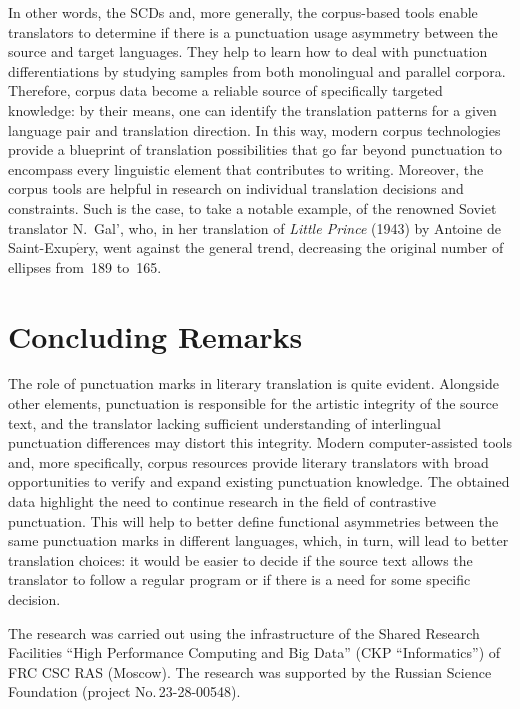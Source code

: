 \begin{multicols}{2}
  In other words, the SCDs and, more generally, the corpus-based tools enable 
translators to determine if there is a punctuation usage asymmetry between the 
source and target languages. They help to learn how to deal with punctuation 
differentiations by studying samples from both monolingual and parallel corpora. 
Therefore, corpus data become a reliable source of specifically targeted 
knowledge: by their means, one can identify the translation patterns for a given 
language pair and translation direction. In this way, modern corpus technologies 
provide a blueprint of translation possibilities that go far beyond punctuation to 
encompass every linguistic element that contributes to writing. Moreover, the 
corpus tools are helpful in research on individual translation decisions and 
constraints. Such is the case, to take a notable example, of the renowned Soviet 
translator N.~Gal', who, in her translation of \textit{Little Prince} (1943) by 
Antoine de Saint-Exup$\acute{\mbox{e}}$ry, went against the general trend, 
decreasing the original number of ellipses from~189 to~165.
  
    \section{Concluding Remarks}
    
    \noindent
     The role of punctuation marks in literary translation is quite evident. 
Alongside other elements, punctuation is responsible for the artistic integrity of the 
source text, and the translator lacking sufficient understanding of interlingual 
punctuation differences may distort this integrity. Modern computer-assisted tools 
and, more specifically, corpus resources provide literary translators with broad 
opportunities to verify and expand existing punctuation knowledge. The obtained 
data highlight the need to continue research in the field of contrastive punctuation. 
This will help to better define functional asymmetries between the same 
punctuation marks in different languages, which, in turn, will lead to better 
translation choices: it would be easier to decide if the source text allows the 
translator to follow a regular program or if there is a need for some specific 
decision.
     
  \Ack
  \noindent
  The research was carried out using the infrastructure of the Shared Research 
Facilities ``High Performance Computing and Big Data'' (CKP ``Informatics'') of 
FRC CSC RAS (Moscow). The research was supported by the Russian Science 
Foundation (project No.\,23-28-00548).




\end{multicols}
